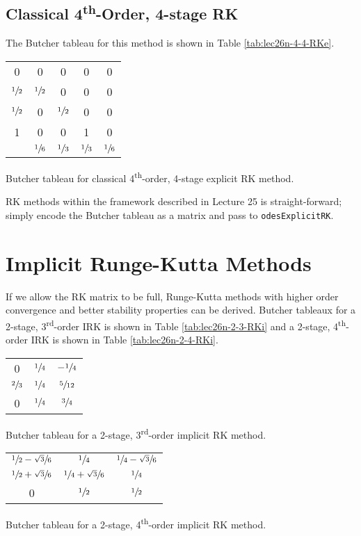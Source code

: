 \subsection{Classical 4\textsuperscript{th}-Order, 4-stage RK}
The Butcher tableau for this method is shown in Table \ref{tab:lec26n-4-4-RKe}.
\begin{margintable}
\begin{tabular}{c|cccc}
0 & 0 & 0 & 0 & 0 \\
$\sfrac{1}{2}$ & $\sfrac{1}{2}$ & 0 & 0 & 0 \\
$\sfrac{1}{2}$ & 0 & $\sfrac{1}{2}$ & 0 & 0 \\
1 & 0 & 0 & 1 & 0 \\ \hline
  & $\sfrac{1}{6}$ & $\sfrac{1}{3}$ & $\sfrac{1}{3}$ & $\sfrac{1}{6}$
\end{tabular}
\caption{Butcher tableau for classical 4\textsuperscript{th}-order, 4-stage explicit RK method.}
\label{tab:lec26n-4-4-RKe}
\end{margintable} 

 RK methods within the framework described in Lecture 25 is straight-forward; simply encode the Butcher tableau as a matrix and pass to \lstinline[style=myMatlab]{odesExplicitRK}.
\section{Implicit Runge-Kutta Methods}

If we allow the RK matrix to be full, Runge-Kutta methods with higher order convergence and better stability properties can be derived. Butcher tableaux for a 2-stage, 3\textsuperscript{rd}-order IRK is shown in Table \ref{tab:lec26n-2-3-RKi} and a 2-stage, 4\textsuperscript{th}-order IRK is shown in Table \ref{tab:lec26n-2-4-RKi}.

\begin{margintable}
\begin{tabular}{c|cc}
0 & $\sfrac{1}{4}$ & $-\sfrac{1}{4}$ \\
$\sfrac{2}{3}$ & $\sfrac{1}{4}$ & $\sfrac{5}{12}$ \\ \hline
0 & $\sfrac{1}{4}$ & $\sfrac{3}{4}$ 
\end{tabular}
\caption{Butcher tableau for a 2-stage, 3\textsuperscript{rd}-order implicit RK method.}
\label{tab:lec26n-2-3-RKi}
\end{margintable}

\begin{margintable}
\begin{tabular}{c|cc}
$\sfrac{1}{2}-\sfrac{\sqrt{3}}{6}$ & $\sfrac{1}{4}$ & $\sfrac{1}{4}-\sfrac{\sqrt{3}}{6}$ \\
$\sfrac{1}{2}+\sfrac{\sqrt{3}}{6}$ & $\sfrac{1}{4}+\sfrac{\sqrt{3}}{6}$ & $\sfrac{1}{4}$ \\ \hline
0 & $\sfrac{1}{2}$ & $\sfrac{1}{2}$
\end{tabular}
\caption{Butcher tableau for a 2-stage, 4\textsuperscript{th}-order implicit RK method.}
\label{tab:lec26n-2-4-RKi}
\end{margintable}

